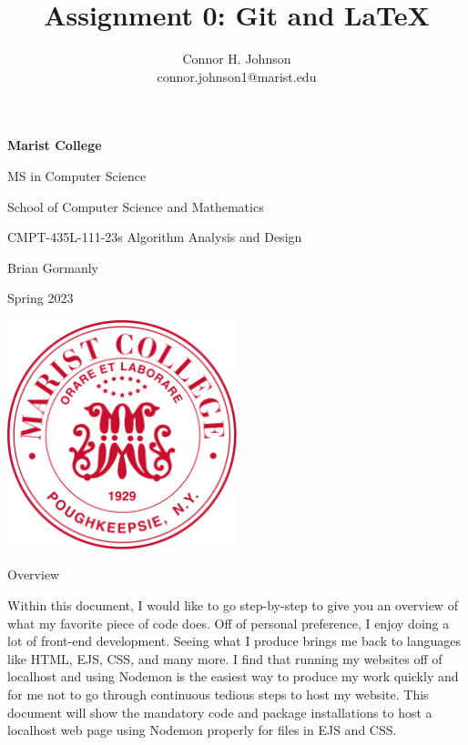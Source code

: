 \documentclass[a4paper,12pt]{article}
\title{Assignment 0: Git and LaTeX}
\author{Connor H. Johnson \\ connor.johnson1@marist.edu}
\begin{document}
\begin{center} \vfill
\textbf{\Large Marist College}

{\large MS in Computer Science

School of Computer Science and Mathematics \vfill

CMPT-435L-111-23s Algorithm Analysis and Design 

Brian Gormanly

Spring 2023 

\vfill
\includegraphics[width=0.5\textwidth]{Marist.png} \vfill

\emph{\Large\thetitle} \vfill 
\theauthor} \vfill

\end{center} \clearpage
\maketitle

\begin{center}
\begin{large}
    Overview
\end{large}    
\end{center}

\begin{center} \noindent
Within this document, I would like to go step-by-step to give you an overview of what my favorite piece of code does.
Off of personal preference, I enjoy doing a lot of front-end development. Seeing what I produce brings me back to languages like HTML, EJS, CSS, and many more. I find that running my websites off of localhost and using Nodemon is the easiest way to produce my work quickly and for me not to go through continuous tedious steps to host my website. 
This document will show the mandatory code and package installations to host a localhost web page using Nodemon properly for files in EJS and CSS.
\end{center}
\end{document}
